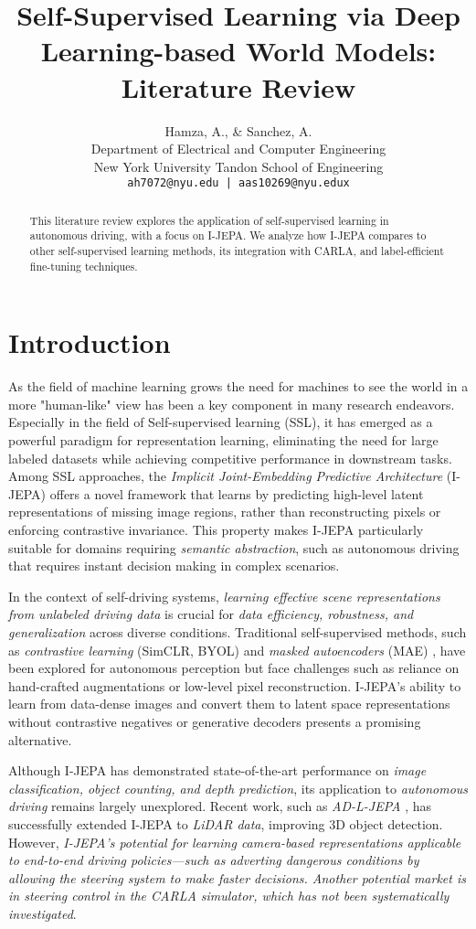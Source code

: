 \documentclass{article}
\title{Self-Supervised Learning via Deep Learning-based World Models: Literature Review}
\author{
    Hamza, A., \& Sanchez, A. \\
    Department of Electrical and Computer Engineering \\
    New York University Tandon School of Engineering \\
    \texttt{ah7072@nyu.edu | aas10269@nyu.edux}
}
\begin{document}
\maketitle

\begin{abstract}
    This literature review explores the application of self-supervised learning in autonomous driving, with a focus on I-JEPA. We analyze how I-JEPA compares to other self-supervised learning methods, its integration with CARLA, and label-efficient fine-tuning techniques.
\end{abstract}

\section{Introduction}

As the field of machine learning grows the need for machines to see the world in a more "human-like" view has been a key component in many research endeavors. Especially in the field of Self-supervised learning (SSL), it has emerged as a powerful paradigm for representation learning, eliminating the need for large labeled datasets while achieving competitive performance in downstream tasks. Among SSL approaches, the \textit{Implicit Joint-Embedding Predictive Architecture} (I-JEPA) \citep{jean2023ijepa} offers a novel framework that learns by predicting high-level latent representations of missing image regions, rather than reconstructing pixels or enforcing contrastive invariance. This property makes I-JEPA particularly suitable for domains requiring \textit{semantic abstraction}, such as autonomous driving that requires instant decision making in complex scenarios.

In the context of self-driving systems, \textit{learning effective scene representations from unlabeled driving data} is crucial for \textit{data efficiency, robustness, and generalization} across diverse conditions. Traditional self-supervised methods, such as \textit{contrastive learning} (SimCLR, BYOL) \citep{chen2020simple, grill2020bootstrap} and \textit{masked autoencoders} (MAE) \citep{he2022masked}, have been explored for autonomous perception but face challenges such as reliance on hand-crafted augmentations or low-level pixel reconstruction. I-JEPA's ability to learn from data-dense images and convert them to latent space representations without contrastive negatives or generative decoders presents a promising alternative.

Although I-JEPA has demonstrated state-of-the-art performance on \textit{image classification, object counting, and depth prediction}, its application to \textit{autonomous driving} remains largely unexplored. Recent work, such as \textit{AD-L-JEPA} \citep{zhu2025adljepa}, has successfully extended I-JEPA to \textit{LiDAR data}, improving 3D object detection. However, \textit{I-JEPA’s potential for learning camera-based representations applicable to end-to-end driving policies—such as adverting dangerous conditions by allowing the steering system to make faster decisions. Another potential market is in steering control in the CARLA simulator, which has not been systematically investigated}. 
\end{document}
